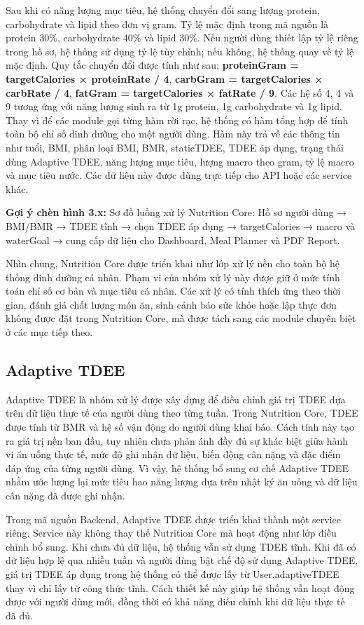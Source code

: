 \documentclass[12pt, a4paper]{report}
\begin{document}
Sau khi có năng lượng mục tiêu, hệ thống chuyển đổi sang lượng protein, carbohydrate và lipid theo đơn vị gram. Tỷ lệ mặc định trong mã nguồn là protein 30\%, carbohydrate 40\% và lipid 30\%. Nếu người dùng thiết lập tỷ lệ riêng trong hồ sơ, hệ thống sử dụng tỷ lệ tùy chỉnh; nếu không, hệ thống quay về tỷ lệ mặc định. Quy tắc chuyển đổi được tính như sau: \textbf{proteinGram = targetCalories × proteinRate / 4}, \textbf{carbGram = targetCalories × carbRate / 4}, \textbf{fatGram = targetCalories × fatRate / 9}. Các hệ số 4, 4 và 9 tương ứng với năng lượng sinh ra từ 1g protein, 1g carbohydrate và 1g lipid.
Thay vì để các module gọi từng hàm rời rạc, hệ thống có hàm tổng hợp để tính toàn bộ chỉ số dinh dưỡng cho một người dùng. Hàm này trả về các thông tin như tuổi, BMI, phân loại BMI, BMR, staticTDEE, TDEE áp dụng, trạng thái dùng Adaptive TDEE, năng lượng mục tiêu, lượng macro theo gram, tỷ lệ macro và mục tiêu nước. Các dữ liệu này được dùng trực tiếp cho API hoặc các service khác.

\textbf{Gợi ý chèn hình 3.x:} Sơ đồ luồng xử lý Nutrition Core: Hồ sơ người dùng → BMI/BMR → TDEE tĩnh → chọn TDEE áp dụng → targetCalories → macro và waterGoal → cung cấp dữ liệu cho Dashboard, Meal Planner và PDF Report.

Nhìn chung, Nutrition Core được triển khai như lớp xử lý nền cho toàn bộ hệ thống dinh dưỡng cá nhân. Phạm vi của nhóm xử lý này được giữ ở mức tính toán chỉ số cơ bản và mục tiêu cá nhân. Các xử lý có tính thích ứng theo thời gian, đánh giá chất lượng món ăn, sinh cảnh báo sức khỏe hoặc lập thực đơn không được đặt trong Nutrition Core, mà được tách sang các module chuyên biệt ở các mục tiếp theo.

\subsection{Adaptive TDEE}Adaptive TDEE là nhóm xử lý được xây dựng để điều chỉnh giá trị TDEE dựa trên dữ liệu thực tế của người dùng theo từng tuần. Trong Nutrition Core, TDEE được tính từ BMR và hệ số vận động do người dùng khai báo. Cách tính này tạo ra giá trị nền ban đầu, tuy nhiên chưa phản ánh đầy đủ sự khác biệt giữa hành vi ăn uống thực tế, mức độ ghi nhận dữ liệu, biến động cân nặng và đặc điểm đáp ứng của từng người dùng. Vì vậy, hệ thống bổ sung cơ chế Adaptive TDEE nhằm ước lượng lại mức tiêu hao năng lượng dựa trên nhật ký ăn uống và dữ liệu cân nặng đã được ghi nhận.

Trong mã nguồn Backend, Adaptive TDEE được triển khai thành một service riêng. Service này không thay thế Nutrition Core mà hoạt động như lớp điều chỉnh bổ sung. Khi chưa đủ dữ liệu, hệ thống vẫn sử dụng TDEE tĩnh. Khi đã có dữ liệu hợp lệ qua nhiều tuần và người dùng bật chế độ sử dụng Adaptive TDEE, giá trị TDEE áp dụng trong hệ thống có thể được lấy từ User.adaptiveTDEE thay vì chỉ lấy từ công thức tĩnh. Cách thiết kế này giúp hệ thống vẫn hoạt động được với người dùng mới, đồng thời có khả năng điều chỉnh khi dữ liệu thực tế đã đủ.
\end{document}
